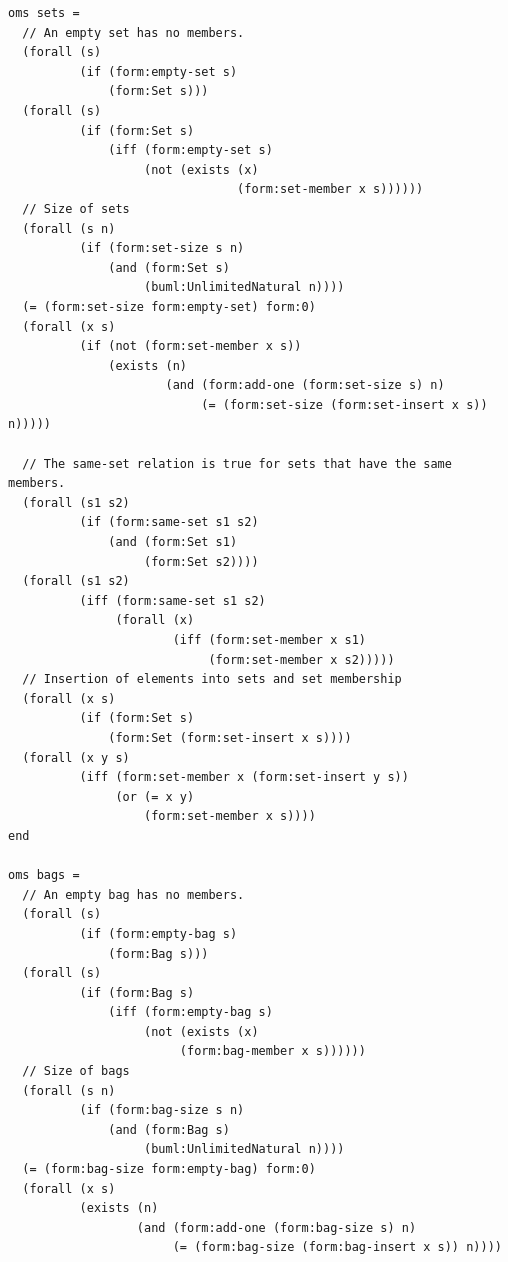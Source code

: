 \documentclass[10pt, a4paper]{isov2}
\begin{document}
\begin{lstlisting}
oms sets =
  // An empty set has no members.
  (forall (s)
          (if (form:empty-set s)
              (form:Set s)))
  (forall (s)
          (if (form:Set s)
              (iff (form:empty-set s)
                   (not (exists (x)
                                (form:set-member x s))))))
  // Size of sets
  (forall (s n)
          (if (form:set-size s n)
              (and (form:Set s)
                   (buml:UnlimitedNatural n))))
  (= (form:set-size form:empty-set) form:0)
  (forall (x s)
          (if (not (form:set-member x s))
              (exists (n)
                      (and (form:add-one (form:set-size s) n)
                           (= (form:set-size (form:set-insert x s)) n)))))

  // The same-set relation is true for sets that have the same members.
  (forall (s1 s2)
          (if (form:same-set s1 s2)
              (and (form:Set s1)
                   (form:Set s2))))
  (forall (s1 s2)
          (iff (form:same-set s1 s2)
               (forall (x)
                       (iff (form:set-member x s1)
                            (form:set-member x s2)))))
  // Insertion of elements into sets and set membership
  (forall (x s)
          (if (form:Set s)
              (form:Set (form:set-insert x s))))
  (forall (x y s)
          (iff (form:set-member x (form:set-insert y s))
               (or (= x y)
                   (form:set-member x s))))
end

oms bags =
  // An empty bag has no members.
  (forall (s)
          (if (form:empty-bag s)
              (form:Bag s)))
  (forall (s)
          (if (form:Bag s)
              (iff (form:empty-bag s)
                   (not (exists (x)
                        (form:bag-member x s))))))
  // Size of bags
  (forall (s n)
          (if (form:bag-size s n)
              (and (form:Bag s)
                   (buml:UnlimitedNatural n))))
  (= (form:bag-size form:empty-bag) form:0)
  (forall (x s)
          (exists (n)
                  (and (form:add-one (form:bag-size s) n)
                       (= (form:bag-size (form:bag-insert x s)) n))))


\end{lstlisting}
\end{document}

